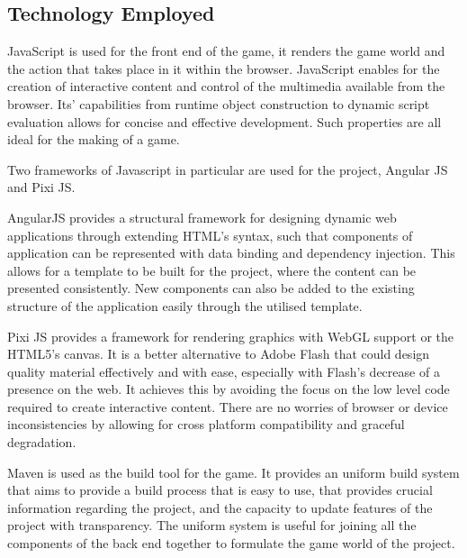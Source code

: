 \subsection*{Technology Employed}

JavaScript is used for the front end of the game, it renders the game world and the action that takes place in it within the browser. JavaScript enables for the creation of interactive content and control of the multimedia available from the browser. Its' capabilities from runtime object construction to dynamic script evaluation allows for concise and effective development. Such properties are all ideal for the making of a game. 

Two frameworks of Javascript in particular are used for the project, Angular JS and Pixi JS. 


 
AngularJS provides a structural framework for designing dynamic web applications through extending HTML's syntax, such that components of application can be represented with data binding and dependency injection. This allows for a template to be built for the project, where the content can be presented consistently. New components can also be added to the existing structure of the application easily through the utilised template.




Pixi JS provides a framework for rendering graphics with WebGL support or the HTML5’s canvas. It is a better alternative to Adobe Flash that could design quality material effectively and with ease, especially with Flash's decrease of a presence on the web. It achieves this by avoiding the focus on the low level code required to create interactive content. There are no worries of browser or device inconsistencies by allowing for cross platform compatibility and graceful degradation.







Maven is used as the build tool for the game. It provides an uniform build system that aims to provide a build process that is easy to use, that provides crucial information regarding the project, and the capacity to update features of the project with transparency. The uniform system is useful for joining all the components of the back end together to formulate the game world of the project.







